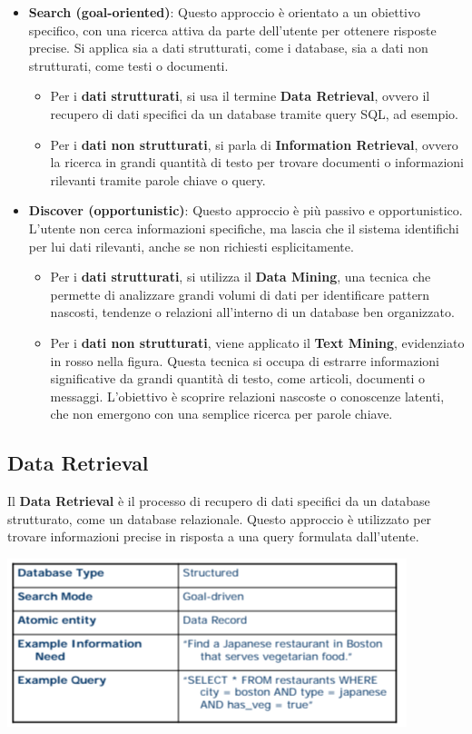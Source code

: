 \documentclass{report}
\begin{document}
	\begin{itemize}
    \item \textbf{Search (goal-oriented)}: 
    Questo approccio è orientato a un obiettivo specifico, con una ricerca attiva da parte dell'utente per ottenere risposte precise. Si applica sia a dati strutturati, come i database, sia a dati non strutturati, come testi o documenti.
    \begin{itemize}
        \item Per i \textbf{dati strutturati}, si usa il termine \textbf{Data Retrieval}, ovvero il recupero di dati specifici da un database tramite query SQL, ad esempio.
        \item Per i \textbf{dati non strutturati}, si parla di \textbf{Information Retrieval}, ovvero la ricerca in grandi quantità di testo per trovare documenti o informazioni rilevanti tramite parole chiave o query.
    \end{itemize}

    \item \textbf{Discover (opportunistic)}:
    Questo approccio è più passivo e opportunistico. L'utente non cerca informazioni specifiche, ma lascia che il sistema identifichi per lui dati rilevanti, anche se non richiesti esplicitamente.
    	\begin{itemize}
        	\item Per i \textbf{dati strutturati}, si utilizza il \textbf{Data Mining}, una tecnica che permette di analizzare grandi volumi di dati per identificare pattern nascosti, tendenze o relazioni all'interno di un database ben organizzato.
        	\item Per i \textbf{dati non strutturati}, viene applicato il \textbf{Text Mining}, evidenziato in rosso nella figura. Questa tecnica si occupa di estrarre informazioni significative da grandi quantità di testo, come articoli, documenti o messaggi. L'obiettivo è scoprire relazioni nascoste o conoscenze latenti, che non emergono con una semplice ricerca per parole chiave.
    	\end{itemize}
	\end{itemize}

	\subsection{Data Retrieval}
	Il \textbf{Data Retrieval} è il processo di recupero di dati specifici da un database strutturato, come un database relazionale. Questo approccio è utilizzato per trovare informazioni precise in risposta a una query formulata dall'utente. 
	\begin{center}
		\includegraphics[scale=0.6]{assets/dataretrieval.png}
	\end{center}
\end{document}
